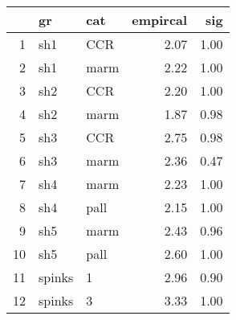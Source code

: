 \begin{table}[ht]
\centering
\begin{tabular}{rllrr}
  \hline
 & gr & cat & empircal & sig \\ 
  \hline
1 & sh1 & CCR & 2.07 & 1.00 \\ 
  2 & sh1 & marm & 2.22 & 1.00 \\ 
  3 & sh2 & CCR & 2.20 & 1.00 \\ 
  4 & sh2 & marm & 1.87 & 0.98 \\ 
  5 & sh3 & CCR & 2.75 & 0.98 \\ 
  6 & sh3 & marm & 2.36 & 0.47 \\ 
  7 & sh4 & marm & 2.23 & 1.00 \\ 
  8 & sh4 & pall & 2.15 & 1.00 \\ 
  9 & sh5 & marm & 2.43 & 0.96 \\ 
  10 & sh5 & pall & 2.60 & 1.00 \\ 
  11 & spinks & 1 & 2.96 & 0.90 \\ 
  12 & spinks & 3 & 3.33 & 1.00 \\ 
   \hline
\end{tabular}
\label{llmiss}
\end{table}
